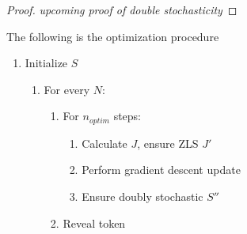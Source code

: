 \begin{proof}
\emph{upcoming proof of double stochasticity}
\end{proof}

The following is the optimization procedure
\begin{enumerate}
    \item Initialize $S$
    \begin{enumerate}
    \item For every $N$:
        \begin{enumerate}
            \item For $n_{optim}$ steps:
    \begin{enumerate}
        \item Calculate $J$, ensure ZLS $J'$
        \item Perform gradient descent update
        \item Ensure doubly stochastic $S''$
    \end{enumerate}
    \item Reveal token
        \end{enumerate}
    \end{enumerate}
\end{enumerate}
